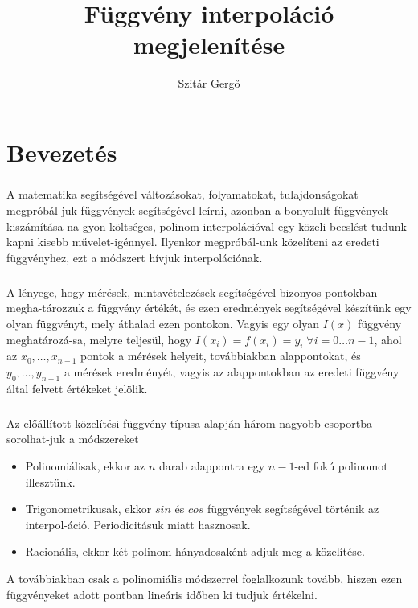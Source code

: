 \documentclass{elteikthesis}
\title{Függvény interpoláció megjelenítése}
\author{Szitár Gergő}
\begin{document}
\frontmatter

	\maketitle
	\tableofcontents
	
\mainmatter

\chapter{Bevezetés}
\paragraph{}
A matematika segítségével változásokat, folyamatokat, tulajdonságokat megpróbál-juk függvények segítségével leírni, azonban a bonyolult függvények kiszámítása na-gyon költséges, polinom interpolációval egy közeli becslést tudunk kapni kisebb művelet-igénnyel. Ilyenkor megpróbál-unk közelíteni az eredeti függvényhez, ezt a módszert hívjuk interpolációnak.
\paragraph{}
A lényege, hogy mérések, mintavételezések segítségével bizonyos pontokban megha-tározzuk a függvény értékét, és ezen eredmények segítségével készítünk egy olyan függvényt, mely áthalad ezen pontokon. Vagyis egy olyan $I(x)$ függvény meghatározá-sa, melyre teljesül, hogy $I(x_i)=f(x_i)=y_i \; \forall i = 0\dots{n-1}$, ahol az $x_0, \dots, x_{n-1}$ pontok a mérések helyeit, továbbiakban alappontokat, és $y_0, \dots, y_{n-1}$ a mérések eredményét, vagyis az alappontokban az eredeti függvény által felvett értékeket jelölik.
\paragraph{}
Az előállított közelítési függvény típusa alapján három nagyobb csoportba sorolhat-juk a módszereket
\begin{itemize}
\item Polinomiálisak, ekkor az $n$ darab alappontra egy $n-1$-ed fokú polinomot illesztünk.
\item Trigonometrikusak, ekkor $sin$ és $cos$ függvények segítségével történik az interpol-áció. Periodicitásuk miatt hasznosak.
\item Racionális, ekkor két polinom hányadosaként adjuk meg a közelítése.
\end{itemize}
A továbbiakban csak a polinomiális módszerrel foglalkozunk tovább, hiszen ezen függvényeket adott pontban lineáris időben ki tudjuk értékelni.
\end{document}
